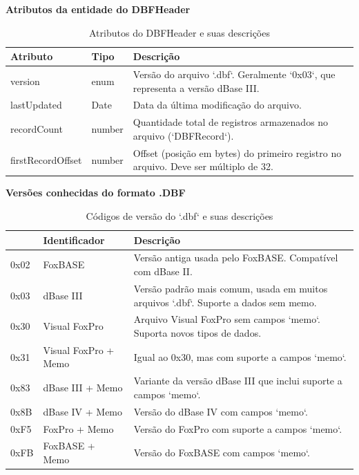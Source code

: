 \begin{table}[H]
    \centering
    \textbf{Atributos da entidade do DBFHeader}
    \begin{tabular}{|p{} | p{} | p{}|}
        \hline
        \textbf{Atributo} & \textbf{Tipo} & \textbf{Descrição} \\
        \hline
        version & enum & Versão do arquivo `.dbf`. Geralmente `0x03`, que representa a versão dBase III. \\
        \hline
        lastUpdated & Date & Data da última modificação do arquivo. \\
        \hline
        recordCount & number & Quantidade total de registros armazenados no arquivo (`DBFRecord`). \\
        \hline
        firstRecordOffset & number & Offset (posição em bytes) do primeiro registro no arquivo. Deve ser múltiplo de 32. \\
        \hline
    \end{tabular}
    \caption{Atributos do DBFHeader e suas descrições}
    \label{tab:tabela_atributos_dbfheader}
\end{table}

\begin{table}[H]
    \centering
    \textbf{Versões conhecidas do formato .DBF}
    \begin{tabular}{|p{} | p{} | p{}|}
        \hline
        \textbf{} & \textbf{Identificador} & \textbf{Descrição} \\
        \hline
        0x02 & FoxBASE & Versão antiga usada pelo FoxBASE. Compatível com dBase II. \\
        \hline
        0x03 & dBase III & Versão padrão mais comum, usada em muitos arquivos `.dbf`. Suporte a dados sem memo. \\
        \hline
        0x30 & Visual FoxPro & Arquivo Visual FoxPro sem campos `memo`. Suporta novos tipos de dados. \\
        \hline
        0x31 & Visual FoxPro + Memo & Igual ao 0x30, mas com suporte a campos `memo`. \\
        \hline
        0x83 & dBase III + Memo & Variante da versão dBase III que inclui suporte a campos `memo`. \\
        \hline
        0x8B & dBase IV + Memo & Versão do dBase IV com campos `memo`. \\
        \hline
        0xF5 & FoxPro + Memo & Versão do FoxPro com suporte a campos `memo`. \\
        \hline
        0xFB & FoxBASE + Memo & Versão do FoxBASE com campos `memo`. \\
        \hline
    \end{tabular}
    \caption{Códigos de versão do `.dbf` e suas descrições}
    \label{tab:versoes_dbf}
\end{table}


